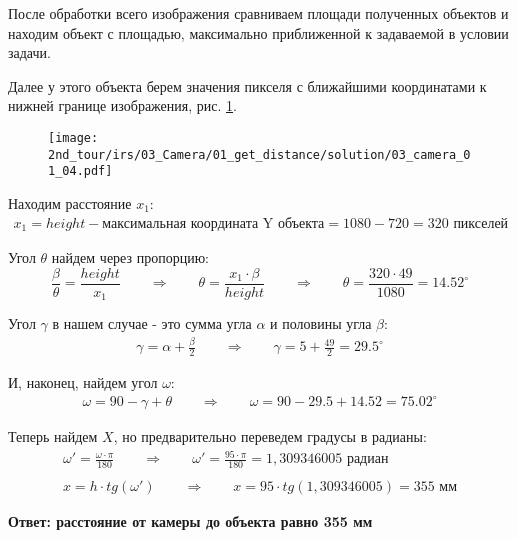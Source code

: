 После обработки всего изображения сравниваем площади полученных объектов и находим объект с площадью, максимально приближенной к задаваемой в условии задачи.

Далее у этого объекта берем значения пикселя с ближайшими координатами к нижней границе изображения, рис. \ref{fig:03_camera_01_04}.
\\
\begin{figure}[H]
	\centering
	\texttt{[image: 2nd\_tour/irs/03\_Camera/01\_get\_distance/solution/03\_camera\_01\_04.pdf]}
	\caption{}
	\label{fig:03_camera_01_04}
\end{figure}

Находим расстояние $x_1$:
\begin{align*}
x_1 = height - \text{максимальная координата Y объекта} = 1080 - 720 = 320 \text{ пикселей}
\end{align*}

Угол $\theta$ найдем через пропорцию:
\begin{equation*}
\frac{\beta}{\theta} = \frac{height}{x_1} \qquad \Rightarrow \qquad \theta = \frac{x_1 \cdot \beta}{height} \qquad \Rightarrow \qquad \theta = \frac{320 \cdot 49}{1080} = 14.52 ^\circ
\end{equation*}

Угол $\gamma$ в нашем случае - это сумма угла $\alpha$ и половины угла $\beta$:
\begin{align*}
\gamma = \alpha + \frac{\beta}{2} \qquad \Rightarrow \qquad \gamma = 5 +  \frac{49}{2} = 29.5^\circ
\end{align*}

И, наконец, найдем угол $\omega$:
\begin{align*}
\omega = 90 - \gamma + \theta \qquad \Rightarrow \qquad \omega = 90 - 29.5 + 14.52 = 75.02^\circ
\end{align*}

Теперь найдем $X$, но предварительно переведем градусы в радианы:
\begin{align*}
\omega' = \frac{\omega \cdot \pi}{180} \qquad \Rightarrow \qquad \omega' = \frac{95 \cdot \pi}{180} = 1,309346005 \text{ радиан} \\ \\
x = h \cdot tg(\omega') \qquad \Rightarrow \qquad x = 95 \cdot tg(1,309346005) = 355 \text{ мм}
\end{align*}

\textbf{Ответ: расстояние от камеры до объекта равно 355 мм}

\codeExample

